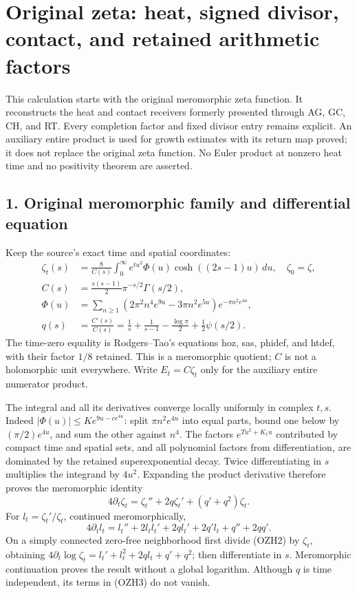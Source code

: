 \documentclass[
  10pt,
  a4paper,
]{article}
\author{}
\date{}
\begin{document}
{
\setcounter{tocdepth}{3}
\tableofcontents
}
\section{Original zeta: heat, signed divisor, contact, and retained
arithmetic
factors}\label{original-zeta-heat-signed-divisor-contact-and-retained-arithmetic-factors}

This calculation starts with the original meromorphic zeta function. It
reconstructs the heat and contact receivers formerly presented through
AG, GC, CH, and RT. Every completion factor and fixed divisor entry
remains explicit. An auxiliary entire product is used for growth
estimates with its return map proved; it does not replace the original
zeta function. No Euler product at nonzero heat time and no positivity
theorem are asserted.

\subsection{1. Original meromorphic family and differential
equation}\label{original-meromorphic-family-and-differential-equation}

Keep the source's exact time and spatial coordinates: \[
\begin{aligned}
\zeta_t(s)&=\frac{8}{C(s)}
\int_0^\infty e^{tu^2}\Phi(u)\cosh((2s-1)u)\,du,\quad \zeta_0=\zeta,\\
C(s)&=\frac{s(s-1)}2\pi^{-s/2}\Gamma(s/2),\\
\Phi(u)&=\sum_{n\ge1}
(2\pi^2n^4e^{9u}-3\pi n^2e^{5u})e^{-\pi n^2e^{4u}},\\
q(s)&=\frac{C'(s)}{C(s)}
=\frac1s+\frac1{s-1}-\frac{\log\pi}2+\frac12\psi(s/2).
\end{aligned}\tag{OZH1}
\] The time-zero equality is Rodgers--Tao's equations hoz, sas, phidef,
and htdef, with their factor \(1/8\) retained. This is a meromorphic
quotient; \(C\) is not a holomorphic unit everywhere. Write
\(E_t=C\zeta_t\) only for the auxiliary entire numerator product.

The integral and all its derivatives converge locally uniformly in
complex \(t,s\). Indeed \(|\Phi(u)|\le K e^{9u-ce^{4u}}\): split
\(\pi n^2e^{4u}\) into equal parts, bound one below by
\((\pi/2)e^{4u}\), and sum the other against \(n^4\). The factors
\(e^{Tu^2+K_1u}\) contributed by compact time and spatial sets, and all
polynomial factors from differentiation, are dominated by the retained
superexponential decay. Twice differentiating in \(s\) multiplies the
integrand by \(4u^2\). Expanding the product derivative therefore proves
the meromorphic identity \[
\boxed{4\partial_t\zeta_t
=\zeta_t''+2q\zeta_t'+(q'+q^2)\zeta_t.}
\tag{OZH2}
\] For \(l_t=\zeta_t'/\zeta_t\), continued meromorphically, \[
\boxed{4\partial_t l_t
=l_t''+2l_tl_t'+2q l_t'+2q'l_t+q''+2qq'.}
\tag{OZH3}
\] On a simply connected zero-free neighborhood first divide (OZH2) by
\(\zeta_t\), obtaining
\(4\partial_t\log\zeta_t=l_t'+l_t^2+2ql_t+q'+q^2\); then differentiate
in \(s\). Meromorphic continuation proves the result without a global
logarithm. Although \(q\) is time independent, its terms in (OZH3) do
not vanish.
\end{document}
